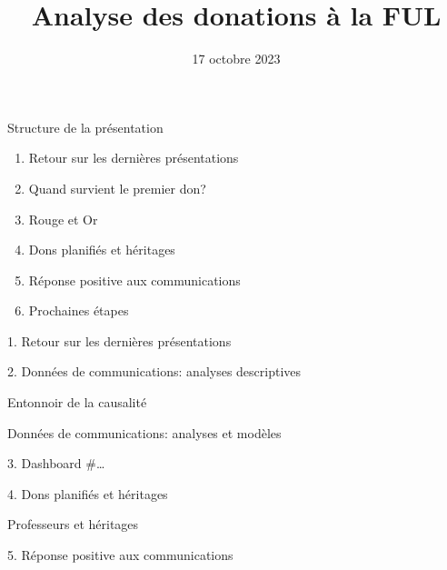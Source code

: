 \documentclass[12pt,ignorenonframetext,]{beamer}
\title{Analyse des donations à la FUL}
\date{17 octobre 2023}
\providecommand{\tightlist}{%
  \setlength{\itemsep}{0pt}\setlength{\parskip}{0pt}}
\begin{document}
\frame{\titlepage}

\begin{frame}{Structure de la présentation}
\protect\hypertarget{structure-de-la-pruxe9sentation}{}
\begin{enumerate}
\tightlist
\item
  Retour sur les dernières présentations
\item
  Quand survient le premier don?
\item
  Rouge et Or
\item
  Dons planifiés et héritages
\item
  Réponse positive aux communications
\item
  Prochaines étapes
\end{enumerate}
\end{frame}

\begin{frame}{1. Retour sur les dernières présentations}
\protect\hypertarget{retour-sur-les-derniuxe8res-pruxe9sentations}{}
\end{frame}

\begin{frame}{2. Données de communications: analyses descriptives}
\protect\hypertarget{donnuxe9es-de-communications-analyses-descriptives}{}
\end{frame}

\begin{frame}{Entonnoir de la causalité}
\protect\hypertarget{entonnoir-de-la-causalituxe9}{}
\end{frame}

\begin{frame}{Données de communications: analyses et modèles}
\protect\hypertarget{donnuxe9es-de-communications-analyses-et-moduxe8les}{}
\end{frame}

\begin{frame}{3. Dashboard}
\protect\hypertarget{dashboard}{}
\#\ldots{}
\end{frame}

\begin{frame}{4. Dons planifiés et héritages}
\protect\hypertarget{dons-planifiuxe9s-et-huxe9ritages}{}
\end{frame}

\begin{frame}{Professeurs et héritages}
\protect\hypertarget{professeurs-et-huxe9ritages}{}
\end{frame}

\begin{frame}{5. Réponse positive aux communications}
\protect\hypertarget{ruxe9ponse-positive-aux-communications}{}
\end{frame}
\end{document}
